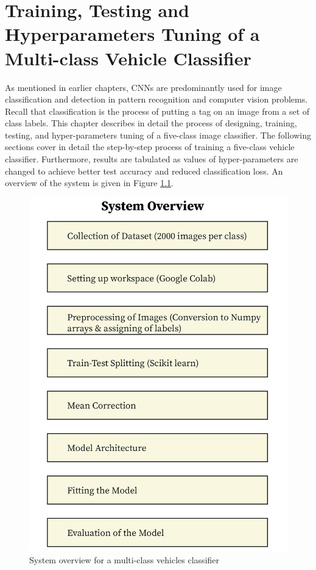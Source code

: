 \chapter{Training, Testing and Hyperparameters Tuning of a Multi-class
Vehicle Classifier}
\label{Chapter 4}
As mentioned in earlier chapters, CNNs are predominantly used for
image classification and detection in pattern recognition and
computer vision problems. Recall that classification is the process of putting a tag on
an image from a set of class labels. This chapter describes in detail
the process of designing, training, testing, and hyper-parameters
tuning of a five-class image classifier. The following sections
cover in detail the step-by-step process of training a five-class vehicle
classifier. Furthermore, results are tabulated as values of
hyper-parameters are changed to achieve better test accuracy and reduced
classification loss. An overview of the system is given in
Figure \ref{system_overview}.

\begin{figure}
    \centering
    \captionsetup{justification = centering}
    \includegraphics[scale = 0.9]{CHAPTERS/Chapter-4/Images/system_overview-01.jpg}
    \caption{System overview for a multi-class vehicles classifier  } 
    \label{system_overview}
  \end{figure}
